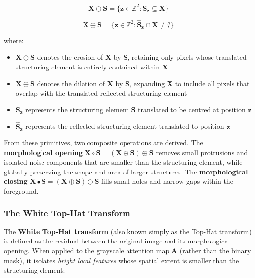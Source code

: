 \begin{equation}
\mathbf{X} \ominus \mathbf{S} = \{ \mathbf{z} \in \mathbb{Z}^2 : \mathbf{S}_{\mathbf{z}} \subseteq \mathbf{X} \}
\end{equation}

\begin{equation}
\mathbf{X} \oplus \mathbf{S} = \{ \mathbf{z} \in \mathbb{Z}^2 : \hat{\mathbf{S}}_{\mathbf{z}} \cap \mathbf{X} \neq \emptyset \}
\end{equation}

where:
\begin{itemize}
\item $\mathbf{X} \ominus \mathbf{S}$ denotes the erosion of $\mathbf{X}$ by $\mathbf{S}$, retaining only pixels whose translated structuring element is entirely contained within $\mathbf{X}$
\item $\mathbf{X} \oplus \mathbf{S}$ denotes the dilation of $\mathbf{X}$ by $\mathbf{S}$, expanding $\mathbf{X}$ to include all pixels that overlap with the translated reflected structuring element
\item $\mathbf{S}_{\mathbf{z}}$ represents the structuring element $\mathbf{S}$ translated to be centred at position $\mathbf{z}$
\item $\hat{\mathbf{S}}_{\mathbf{z}}$ represents the reflected structuring element translated to position $\mathbf{z}$
\end{itemize}

From these primitives, two composite operations are derived. The \textbf{morphological opening} $\mathbf{X} \circ \mathbf{S} = (\mathbf{X} \ominus \mathbf{S}) \oplus \mathbf{S}$ removes small protrusions and isolated noise components that are smaller than the structuring element, while globally preserving the shape and area of larger structures. The \textbf{morphological closing} $\mathbf{X} \bullet \mathbf{S} = (\mathbf{X} \oplus \mathbf{S}) \ominus \mathbf{S}$ fills small holes and narrow gaps within the foreground.

\subsubsection{The White Top-Hat Transform}

The \textbf{White Top-Hat transform} (also known simply as the Top-Hat transform) is defined as the residual between the original image and its morphological opening. When applied to the grayscale attention map $\mathbf{A}$ (rather than the binary mask), it isolates \textit{bright local features} whose spatial extent is smaller than the structuring element:

